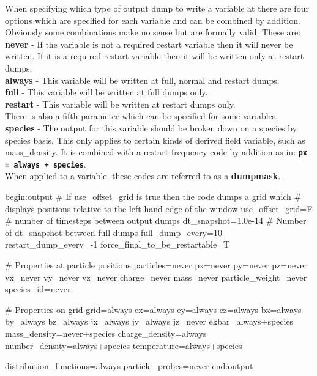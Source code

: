 \documentclass[12pt,a4paper]{article}
\newcommand{\emphtext}{\color{warwickdark} \fontfamily{phv}\selectfont\Large\bf}
\newcommand{\inlinecode}[1]{{\color{warwickred} \bf\texttt{#1}}}
\newcommand{\inlineemph}[1]{{\color{warwicklight} \bf{#1}}}
\newenvironment{lboxverbatim}[1]{
\setlength{\FrameSep}{0pt}
\def\FrameCommand{\fboxsep=0pt \colorbox{shadecolor}}
\MakeFramed{\FrameRestore}
\vspace{-13.5pt}
\fvset{label=#1}
\boxverb
}{
\endboxverb
\vspace{-13.5pt}
\endMakeFramed
}
\begin{document}
When specifying which type of output dump to write a variable at there are four
options which are specified for each variable and can be combined by
addition. Obviously some combinations make no sense but are formally
valid. These are:\\

{\emphtext never} - If the variable is not a required restart variable then it
will never be written. If it is a required restart variable then it will be
written only at restart dumps.\\

{\emphtext always} - This variable will be written at full, normal and restart
dumps.\\

{\emphtext full} - This variable will be written at full dumps only.\\

{\emphtext restart} - This variable will be written at restart dumps only.\\

There is also a fifth parameter which can be specified for some variables.\\

{\emphtext species} - The output for this variable should be broken down on a
species by species basis. This only applies to certain kinds of derived field
variable, such as mass\_density. It is combined with a restart frequency code
by addition as in: \inlinecode{px = always + species}.\\

When applied to a variable, these codes are referred to as a
\inlineemph{dumpmask}.\\

\begin{lboxverbatim}{output block}
begin:output
   # If use_offset_grid is true then the code dumps a grid which
   # displays positions relative to the left hand edge of the window
   use_offset_grid=F
   # number of timesteps between output dumps
   dt_snapshot=1.0e-14
   # Number of dt_snapshot between full dumps
   full_dump_every=10
   restart_dump_every=-1
   force_final_to_be_restartable=T

   # Properties at particle positions
   particles=never
   px=never
   py=never
   pz=never
   vx=never
   vy=never
   vz=never
   charge=never
   mass=never
   particle_weight=never
   species_id=never

   # Properties on grid
   grid=always
   ex=always
   ey=always
   ez=always
   bx=always
   by=always
   bz=always
   jx=always
   jy=always
   jz=never
   ekbar=always+species
   mass_density=never+species
   charge_density=always
   number_density=always+species
   temperature=always+species

   distribution_functions=always
   particle_probes=never
end:output
\end{lboxverbatim}
\end{document}
